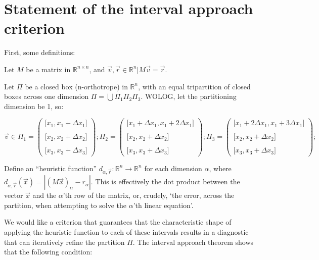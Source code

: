 \documentclass[a4paper,10pt]{article}
\begin{document}
\section{Statement of the interval approach criterion}

First, some definitions:

Let $M$ be a matrix in $\mathbb{R}^{n\times n}$, and $\vec{v}, \vec{r} \in \mathbb{R}^n | M\vec{v} = \vec{r}$.

Let $\varPi$ be a closed box (n-orthotrope) in $\mathbb{R}^n$, with an equal tripartition of closed boxes across 
one dimension $\varPi = \bigcup\varPi_1 \varPi_2 \varPi_3$.
WOLOG, let the partitioning dimension be 1, so: 

\[ \vec{v} \in \varPi_1 = \left( \begin{array}{c}
\big[x_1, x_1 + \Delta x_1\big]  \\ \\
\big[x_2, x_2 + \Delta x_2\big]  \\ \\
\big[x_3, x_3 + \Delta x_3\big]  \end{array} \right); \varPi_2 = \left( \begin{array}{c}
\big[x_1 + \Delta x_1,  x_1 + 2\Delta x_1\big]  \\ \\
\big[x_2, x_2 + \Delta x_2\big]  \\ \\
\big[x_3, x_3 + \Delta x_3\big]  \end{array} \right); \varPi_3 = \left( \begin{array}{c}
\big[x_1 + 2\Delta x_1,  x_1 + 3\Delta x_1\big]  \\ \\
\big[x_2, x_2 + \Delta x_2\big]  \\ \\
\big[x_3, x_3 + \Delta x_3\big]  \end{array} \right);\] 

Define an ``heuristic function'' $d_{\alpha, \vec{r}} : \mathbb{R}^n \rightarrow \mathbb{R}^n$ for each dimension $\alpha$, where
$d_{\alpha, \vec{r}}(\vec{x}) = |(M\vec{x})_\alpha - r_\alpha|$.  This is effectively the dot product between the vector $\vec{x}$ and
the $\alpha$'th row of the matrix, or, crudely, `the error, across the partition, when attempting to solve the $\alpha$'th linear equation'.

We would like a criterion that guarantees that the characteristic shape of applying the heuristic function to each of these
intervals results in a diagnostic that can iteratively refine the partition $\varPi$.  The interval approach theorem shows
that the following condition:
\end{document}
